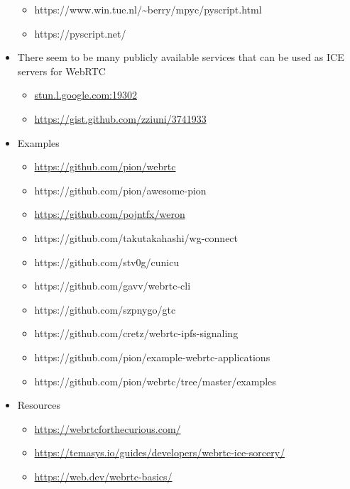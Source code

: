 \begin{itemize}
  \begin{itemize}
  \tightlist
  \item
    https://www.win.tue.nl/\textasciitilde berry/mpyc/pyscript.html
  \item
    https://pyscript.net/
  \end{itemize}
\item
  There seem to be many publicly available services that can be used as ICE servers for WebRTC

  \begin{itemize}
  \tightlist
  \item
    \href{http://stun.l.google.com:19302/}{stun.l.google.com:19302}
  \item
    \url{https://gist.github.com/zziuni/3741933}
  \end{itemize}
\item
  Examples

  \begin{itemize}
  \tightlist
  \item
    \url{https://github.com/pion/webrtc}
  \item
    https://github.com/pion/awesome-pion
  \item
    \url{https://github.com/pojntfx/weron}
  \item
    https://github.com/takutakahashi/wg-connect
  \item
    https://github.com/stv0g/cunicu
  \item
    https://github.com/gavv/webrtc-cli
  \item
    https://github.com/szpnygo/gtc
  \item
    https://github.com/cretz/webrtc-ipfs-signaling
  \item
    https://github.com/pion/example-webrtc-applications
  \item
    https://github.com/pion/webrtc/tree/master/examples
  \end{itemize}
\item
  Resources

  \begin{itemize}
  \tightlist
  \item
    \url{https://webrtcforthecurious.com/}
  \item
    \url{https://temasys.io/guides/developers/webrtc-ice-sorcery/}
  \item
    \href{https://web.dev/webrtc-basics/\#toc-rtcpeerconnection}{https://web.dev/webrtc-basics/}
  \end{itemize}
\end{itemize}

